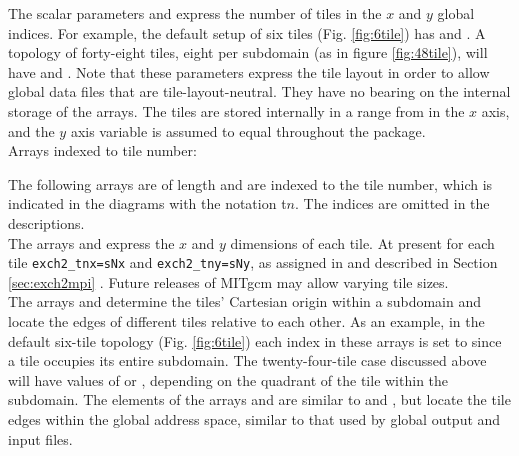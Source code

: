 The scalar parameters 
and  express the number
of tiles in the $x$ and $y$ global indices.  For example, the default
setup of six tiles (Fig. \ref{fig:6tile}) has
 and .  A
topology of forty-eight tiles, eight per subdomain (as in figure
\ref{fig:48tile}), will have  and
.  Note that these parameters express the
tile layout in order to allow global data files that are tile-layout-neutral.
They have no bearing on the internal storage of the arrays.  The tiles
are stored internally in a range from  in the
$x$ axis, and the $y$ axis variable  is assumed to 
equal  throughout the package. \\

Arrays indexed to tile number:

The following arrays are of length  and are indexed to
the tile number, which is indicated in the diagrams with the notation
\textsf{t}$n$.  The indices are omitted in the descriptions. \\

The arrays  and
 express the $x$ and $y$ dimensions of
each tile.  At present for each tile \texttt{exch2\_tnx=sNx} and
\texttt{exch2\_tny=sNy}, as assigned in  and described in
Section \ref{sec:exch2mpi} .  Future releases of MITgcm may allow varying tile
sizes. \\

The arrays  and
 determine the tiles' 
Cartesian origin within a subdomain  
and locate the edges of different tiles relative to each other.  As
an example, in the default six-tile topology (Fig. \ref{fig:6tile})
each index in these arrays is set to  since a tile occupies
its entire subdomain.  The twenty-four-tile case discussed above will
have values of  or , depending on the quadrant of the
tile within the subdomain.  The elements of the arrays
 and
 are similar to
 and
, but locate the tile edges within the
global address space, similar to that used by global output and input
files. \\

